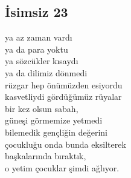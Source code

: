 \subsection{İsimsiz 23}

ya az zaman vardı \\
ya da para yoktu \\
ya sözcükler kısaydı \\
ya da dilimiz dönmedi \\

\noindent\newline
rüzgar hep önümüzden esiyordu \\
kasvetliydi gördüğümüz rüyalar \\
bir kez olsun sabah, \\
güneşi görmemize yetmedi \\

\noindent\newline
bilemedik gençliğin değerini \\
çocukluğu onda bunda eksilterek \\
başkalarında bıraktık, \\
o yetim çocuklar şimdi ağlıyor. \\